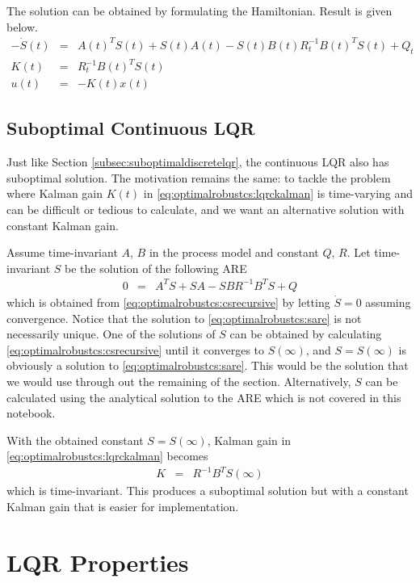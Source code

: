 The solution can be obtained by formulating the Hamiltonian. Result is given below.
\begin{eqnarray}
  -\dot{S}(t) &=& A(t)^TS(t) + S(t)A(t) - S(t)B(t)R_t^{-1}B(t)^TS(t) + Q_t \label{eq:optimalrobustcs:csrecursive} \\
  K(t) &=& R_t^{-1}B(t)^TS(t) \label{eq:optimalrobustcs:lqrckalman} \\
  u(t) &=& -K(t)x(t) \nonumber 
\end{eqnarray}

\subsection{Suboptimal Continuous LQR}

Just like Section \ref{subsec:suboptimaldiscretelqr}, the continuous LQR also has suboptimal solution. The motivation remains the same: to tackle the problem where Kalman gain $K(t)$ in \eqref{eq:optimalrobustcs:lqrckalman} is time-varying and can be difficult or tedious to calculate, and we want an alternative solution with constant Kalman gain.

Assume time-invariant $A$, $B$ in the process model and constant $Q$, $R$. Let time-invariant $S$ be the solution of the following ARE
\begin{eqnarray}
	0 &=& A^TS + SA - SBR^{-1}B^TS + Q \label{eq:optimalrobustcs:sare}
\end{eqnarray}
which is obtained from \eqref{eq:optimalrobustcs:csrecursive} by letting $\dot{S}=0$ assuming convergence. Notice that the solution to \eqref{eq:optimalrobustcs:sare} is not necessarily unique. One of the solutions of $S$ can be obtained by calculating \eqref{eq:optimalrobustcs:csrecursive} until it converges to $S(\infty)$, and $S=S(\infty)$ is obviously a solution to \eqref{eq:optimalrobustcs:sare}. This would be the solution that we would use through out the remaining of the section. Alternatively, $S$ can be calculated using the analytical solution to the ARE which is not covered in this notebook.

With the obtained constant $S=S(\infty)$, Kalman gain in \eqref{eq:optimalrobustcs:lqrckalman} becomes
\begin{eqnarray}
	K &=& R^{-1}B^TS(\infty) \nonumber
\end{eqnarray}
which is time-invariant. This produces a suboptimal solution but with a constant Kalman gain that is easier for implementation.

\section{LQR Properties}

